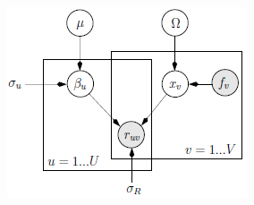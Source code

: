 \documentclass[twosided,a4,10pt]{article}
\begin{document}
\begin{multicols}{2}
		\begin{minipage}{0.45\textwidth}
			\centering
			\includegraphics{img/hlmdbn.png}
			\label{img:hlmdbn}
		\end{minipage}
	

\end{multicols}
\end{document}
